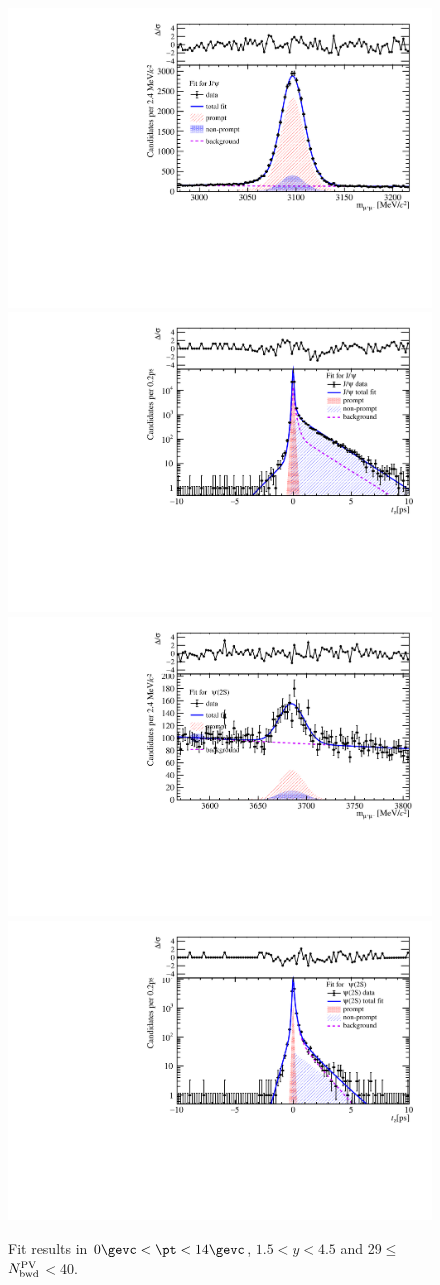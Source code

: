 \begin{figure}[H]
\begin{center}
\includegraphics[width=0.45\linewidth]{pdf/pPb/BWorkdir/TwoDimFit/ProjMass/Jpsi_n3y1pt1.pdf}
\includegraphics[width=0.45\linewidth]{pdf/pPb/BWorkdir/TwoDimFit/ProjTz/Jpsi_n3y1pt1.pdf}
\vspace*{-0.5cm}
\includegraphics[width=0.45\linewidth]{pdf/pPb/BWorkdir/TwoDimFit/ProjMass/Psi2S_n3y1pt1.pdf}
\includegraphics[width=0.45\linewidth]{pdf/pPb/BWorkdir/TwoDimFit/ProjTz/Psi2S_n3y1pt1.pdf}
\vspace*{-0.5cm}
\end{center}
\caption{Fit results in $0\gevc<\pt<14\gevc$, $1.5<y<4.5$ and 29$\leq$$N^{\rm PV}_{\rm bwd}$$<$40.}
\end{figure}
